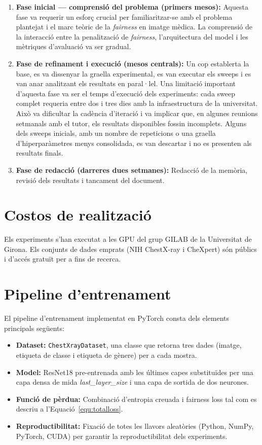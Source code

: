 \documentclass[a4paper,12pt,twoside]{ThesisStyle}
\begin{document}
\begin{enumerate}
    \item \textbf{Fase inicial --- comprensió del problema (primers mesos):} Aquesta fase va requerir un esforç crucial per familiaritzar-se amb el problema plantejat i el marc teòric de la \textit{fairness} en imatge mèdica. La comprensió de la interacció entre la penalització de \textit{fairness}, l'arquitectura del model i les mètriques d'avaluació va ser gradual.

    \item \textbf{Fase de refinament i execució (mesos centrals):} Un cop establerta la base, es va dissenyar la graella experimental, es van executar els sweeps i es van anar analitzant els resultats en paral·lel. Una limitació important d'aquesta fase va ser el temps d'execució dels experiments: cada sweep complet requeria entre dos i tres dies amb la infraestructura de la universitat. Això va dificultar la cadència d'iteració i va implicar que, en algunes reunions setmanals amb el tutor, els resultats disponibles fossin incomplets. Alguns dels sweeps inicials, amb un nombre de repeticions o una graella d'hiperparàmetres menys consolidada, es van descartar i no es presenten als resultats finals.

    \item \textbf{Fase de redacció (darreres dues setmanes):} Redacció de la memòria, revisió dels resultats i tancament del document.
\end{enumerate}

\section{Costos de realització}

Els experiments s'han executat a les GPU del grup GILAB de la Universitat de Girona. Els conjunts de dades emprats (NIH ChestX-ray i CheXpert) són públics i d'accés gratuït per a fins de recerca.

\section{Pipeline d'entrenament}

El pipeline d'entrenament implementat en PyTorch consta dels elements principals següents:

\begin{itemize}
    \item \textbf{Dataset:} \texttt{ChestXrayDataset}, una classe que retorna tres dades (imatge, etiqueta de classe i etiqueta de gènere) per a cada mostra.
    \item \textbf{Model:} ResNet18 pre-entrenada amb les últimes capes substituïdes per una capa densa de mida \textit{last\_layer\_size} i una capa de sortida de dos neurones.
    \item \textbf{Funció de pèrdua:} Combinació d'entropia creuada i fairness loss tal com es descriu a l'Equació~\ref{equ:totalloss}.
    \item \textbf{Reproductibilitat:} Fixació de totes les llavors aleatòries (Python, NumPy, PyTorch, CUDA) per garantir la reproductibilitat dels experiments.
\end{itemize}
\end{document}
